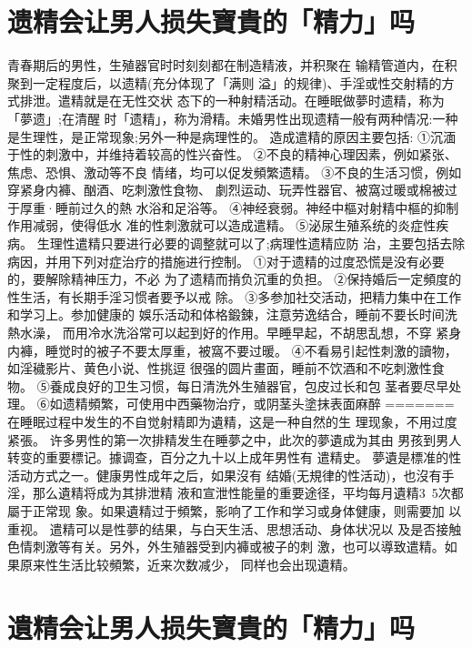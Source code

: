 \documentclass[12pt,UTF8]{ctexbook}
\begin{document}
\section{遗精会让男人损失寶貴的「精力」吗}

青春期后的男性，生殖器官时时刻刻都在制造精液，并积聚在
输精管道内，在积聚到一定程度后，以遗精(充分体现了「满则
溢」的规律)、手淫或性交射精的方式排泄。遣精就是在无性交状
态下的一种射精活动。在睡眠做夢时遗精，称为「夢遗」;在清醒
时「遗精」，称为滑精。未婚男性出现遗精一般有两种情况:一种
是生理性，是正常现象;另外一种是病理性的。
造成遣精的原因主要包括:
①沉湎于性的刺激中，并维持着较高的性兴奋性。
②不良的精神心理因素，例如紧张、焦虑、恐惧、激动等不良
情绪，均可以促发頻繁遗精。
③不良的生活习惯，例如穿紧身内褲、酗酒、吃刺激性食物、
劇烈运动、玩弄性器官、被窩过暖或棉被过于厚重·睡前过久的熱
水浴和足浴等。
④神经衰弱。神经中樞对射精中樞的抑制作用减弱，使得低水
准的性刺激就可以造成遣精。
⑤泌尿生殖系统的炎症性疾病。
生理性遣精只要进行必要的调整就可以了;病理性遗精应防
治，主要包括去除病因，并用下列对症治疗的措施进行控制。
①对于遗精的过度恐慌是没有必要的，要解除精神压力，不必
为了遗精而掯负沉重的负担。
②保持婚后一定頻度的性生活，有长期手淫习惯者要予以戒
除。
③多参加社交活动，把精力集中在工作和学习上。参加健康的
娛乐活动和体格鍛鍊，注意劳逸结合，睡前不要长时间洗熱水澡，
而用冷水洗浴常可以起到好的作用。早睡早起，不胡思乱想，不穿
紧身内褲，睡觉时的被子不要太厚重，被窩不要过暖。
④不看易引起性刺激的讀物，如淫穢影片、黄色小说、性挑逗
很强的圆片畫面，睡前不饮酒和不吃刺激性食物。
⑤養成良好的卫生习惯，每日清洗外生殖器官，包皮过长和包
茎者要尽早处理。
⑥如遗精頻繁，可使用中西藥物治疗，或阴茎头塗抹表面麻醉
=======
在睡眠过程中发生的不自觉射精即为遺精，这是一种自然的生
理现象，不用过度紧張。
许多男性的第一次排精发生在睡夢之中，此次的夢遺成为其由
男孩到男人转变的重要標记。據调查，百分之九十以上成年男性有
遣精史。
夢遺是標准的性活动方式之一。健康男性成年之后，如果沒有
结婚(无規律的性活动)，也沒有手淫，那么遺精将成为其排泄精
液和宣泄性能量的重要途径，平均每月遺精3~5次都屬于正常现
象。如果遺精过于頻繁，影响了工作和学习或身体健康，则需要加
以重视。
遣精可以是性夢的结果，与白天生活、思想活动、身体状况以
及是否接触色情刺激等有关。另外，外生殖器受到内褲或被子的刺
激，也可以導致遣精。如果原来性生活比较頻繁，近来次数减少，
同样也会出现遺精。

\section{遺精会让男人损失寶貴的「精力」吗}
\end{document}
